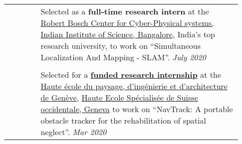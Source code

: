 \documentclass[letterpaper, 10pt, oneside]{article}
\begin{document}
\begin{longtable}{@{} p{0.13\linewidth} p{0.8\linewidth}}
                         & Selected as a \textbf{full-time research intern} at the
    \href{https://cps.iisc.ac.in/}{Robert Bosch Center for Cyber-Physical systems, Indian Institute of Science, Bangalore}, India's top research university, to work on
    ``Simultaneous Localization And Mapping - SLAM''.
    \hfill \textsl{July 2020}                                                                                                                                                                        \\
    \\[-1ex]

                         & Selected for a \href{https://drive.google.com/file/d/1Rtlu6aHQKXntWhfEUcgB5tuNYMuvH04b}{\textbf{funded research internship}}
    at the \href{https://www.hesge.ch/hepia/}{Haute école du paysage, d'ingénierie et d'architecture de Genève}, \href{https://www.hesge.ch/geneve}{Haute Ecole Spécialisée de Suisse occidentale, Geneva}
    to work on ``NavTrack: A portable obstacle tracker for the rehabilitation of spatial neglect''.           \hfill \textsl{Mar 2020}                                                               \\
\end{longtable}
\end{document}
